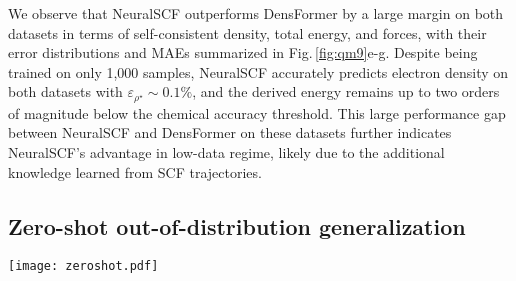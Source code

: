 \documentclass[%
reprint,
superscriptaddress,
bibnotes,
amsmath,amssymb,
aps,
floatfix, %
]{revtex4-2}
\begin{document}
We observe that NeuralSCF outperforms DensFormer by a large margin on both datasets in terms of self-consistent density, total energy, and forces, with their error distributions and MAEs summarized in Fig.\,\ref{fig:qm9}e-g. 
Despite being trained on only 1,000 samples, NeuralSCF accurately predicts electron density on both datasets with $\varepsilon_{\rho^\star} \sim 0.1\%$, and the derived energy remains up to two orders of magnitude below the chemical accuracy threshold. This large performance gap between NeuralSCF and DensFormer on these datasets further indicates NeuralSCF's advantage in low-data regime, likely due to the additional knowledge learned from SCF trajectories.

\subsection{\label{sec:zeroshot}Zero-shot out-of-distribution generalization}

\begin{figure*}[ht!]
  \texttt{[image: zeroshot.pdf]}%
  \caption{\label{fig:zeroshot}\textbf{Zero-shot generalization to a wide range of datasets.} \textbf{(a-c)} Violin plots of absolute errors for self-consistent electron density, derived total energy and forces on MD17's ethanol and malonaldehyde. \textbf{(d-f)} Violin plots of absolute errors for self-consistent electron density, derived total energy and dipole moment on BFDb-SSI. \textbf{(g)} Visualization of predicted density errors on the Glu\textsuperscript{-}/Lys\textsuperscript{+} system, a challenging example from the BFDb-SSI dataset featuring significant charge transfer. \textbf{(h)} The true (dark grey) and predicted torsion energy profiles of 4-dimethylamino-$4^\prime$-nitrostilbene. Shaded regions represent error within chemical accuracy \SI{1}{\kilo\cal\per\mol}.
  }
\end{figure*}
\end{document}
